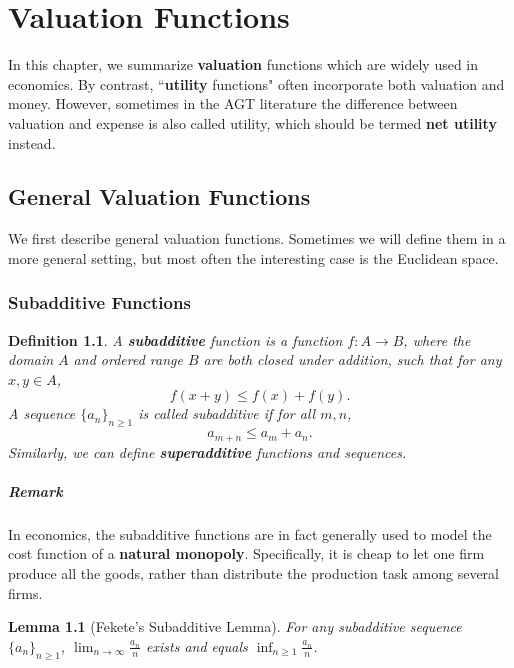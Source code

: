 \documentclass[openany]{book}
\newtheorem{definition}{Definition}[chapter]
\newtheorem{lemma}{Lemma}[chapter]
\theoremstyle{remark}
\begin{document}
\appendix
\chapter{Valuation Functions}
In this chapter, we summarize \textbf{valuation} functions which are widely used in economics. By contrast, ``\textbf{utility} functions" often incorporate both valuation and money. However, sometimes in the AGT literature the difference between valuation and expense is also called utility, which should be termed \textbf{net utility} instead.

\section{General Valuation Functions}
We first describe general valuation functions. Sometimes we will define them in a more general setting, but most often the interesting case is the Euclidean space.

\subsection{Subadditive Functions}
\begin{definition}
    A \textbf{subadditive} function is a function $f:A\to B$, where the domain $A$ and ordered range $B$ are both closed under addition, such that for any $x,y\in A$,
    \begin{equation}\label{subaFunc}
        f(x+y)\le f(x)+f(y).
    \end{equation}
    A sequence $\{a_n\}_{n\ge1}$ is called subadditive if for all $m,n$,
    \begin{equation}\label{subaSeq}
        a_{m+n}\le a_m+a_n.
    \end{equation}
    Similarly, we can define \textbf{superadditive} functions and sequences.
\end{definition}
\paragraph{Remark}
In economics, the subadditive functions are in fact generally used to model the cost function of a \textbf{natural monopoly}. Specifically, it is cheap to let one firm produce all the goods, rather than distribute the production task among several firms.

\begin{lemma}[Fekete's Subadditive Lemma]
    For any subadditive sequence $\{a_n\}_{n\ge1}$, $\lim_{n\to\infty}\frac{a_n}{n}$ exists and equals $\inf_{n\ge1}\frac{a_n}{n}$.
\end{lemma}
\end{document}
